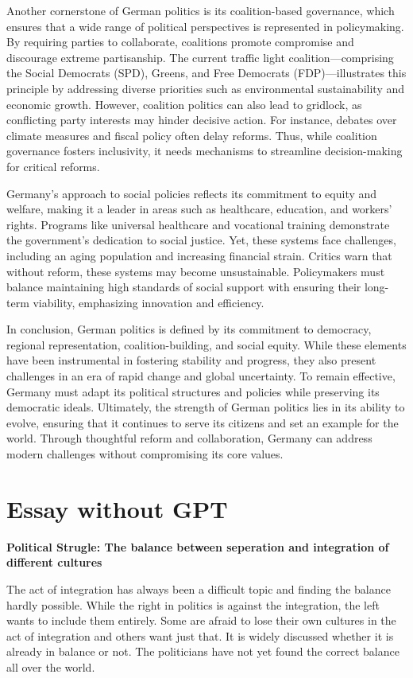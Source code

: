 \documentclass{article}
\begin{document}
Another cornerstone of German politics is its coalition-based governance, which ensures that a wide range of political perspectives is represented in policymaking. By requiring parties to collaborate, coalitions promote compromise and discourage extreme partisanship. The current traffic light coalition—comprising the Social Democrats (SPD), Greens, and Free Democrats (FDP)—illustrates this principle by addressing diverse priorities such as environmental sustainability and economic growth. However, coalition politics can also lead to gridlock, as conflicting party interests may hinder decisive action. For instance, debates over climate measures and fiscal policy often delay reforms. Thus, while coalition governance fosters inclusivity, it needs mechanisms to streamline decision-making for critical reforms.

Germany's approach to social policies reflects its commitment to equity and welfare, making it a leader in areas such as healthcare, education, and workers’ rights. Programs like universal healthcare and vocational training demonstrate the government’s dedication to social justice. Yet, these systems face challenges, including an aging population and increasing financial strain. Critics warn that without reform, these systems may become unsustainable. Policymakers must balance maintaining high standards of social support with ensuring their long-term viability, emphasizing innovation and efficiency.

In conclusion, German politics is defined by its commitment to democracy, regional representation, coalition-building, and social equity. While these elements have been instrumental in fostering stability and progress, they also present challenges in an era of rapid change and global uncertainty. To remain effective, Germany must adapt its political structures and policies while preserving its democratic ideals. Ultimately, the strength of German politics lies in its ability to evolve, ensuring that it continues to serve its citizens and set an example for the world. Through thoughtful reform and collaboration, Germany can address modern challenges without compromising its core values.

\newpage
\section{Essay without GPT}
\textbf{Political Strugle: The balance between seperation and integration of different cultures}

The act of integration has always been a difficult topic and finding the balance hardly possible. While the right in politics is against the integration, the left wants to include them entirely. Some are afraid to lose their own cultures in the act of integration and others want just that. It is widely discussed whether it is already in balance or not. The politicians have not yet found the correct balance all over the world.
\end{document}
